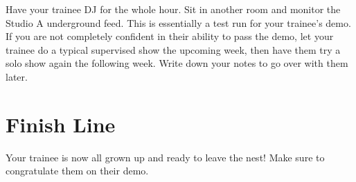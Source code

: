 \documentclass{witrman}
\begin{document}
Have your trainee DJ for the whole hour.  Sit in another room and monitor the
Studio A underground feed.  This is essentially a test run for your trainee's
demo.  If you are not completely confident in their ability to pass the demo,
let your trainee do a typical supervised show the upcoming week, then have them
try a solo show again the following week.  Write down your notes to go over with
them later.


\chapter{Finish Line}

Your trainee is now all grown up and ready to leave the nest!  Make sure to
congratulate them on their demo.

\makefooter
\end{document}
